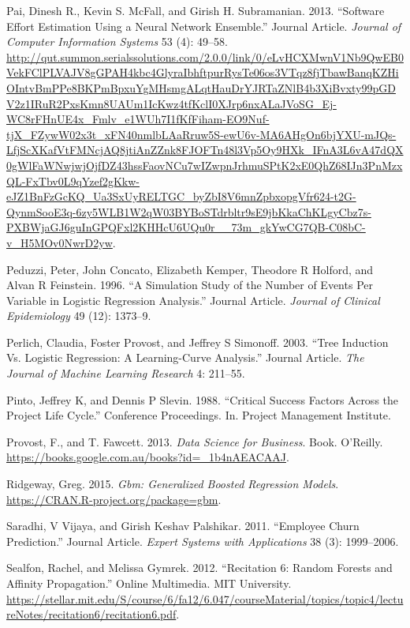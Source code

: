 \documentclass[]{elsarticle} %
\begin{document}
\hypertarget{ref-Pai2013}{}
Pai, Dinesh R., Kevin S. McFall, and Girish H. Subramanian. 2013.
``Software Effort Estimation Using a Neural Network Ensemble.'' Journal
Article. \emph{Journal of Computer Information Systems} 53 (4): 49--58.
\url{http://qut.summon.serialssolutions.com/2.0.0/link/0/eLvHCXMwnV1Nb9QwEB0VekFClPLVAJV8gGPAH4kbc4GlyraIbhftpurRysTe06os3VTqz8fjTbawBanqKZHiOIntvBmPPe8BKPmBpxuYgMHsmgALqtHauDrYJRTaZNlB4b3XiBvxty99pGDV2z1IRuR2PxsKmn8UAUm1IcKwz4tfKclI0XJrp6nxALaJVoSG_Ej-WC8rFHnUE4x_Fmlv_e1WUh7I1fKfFiham-EO9Nuf-tjX_FZywW02x3t_xFN40nmlbLAaRruw5S-ewU6v-MA6AHgOn6bjYXU-mJQs-LfjScXKafVtFMNcjAQ8jtiAnZZnk8FJOFTn48l3Vp5Oy9HXk_IFnA3L6vA47dQX0gWlFaWNwjwjOjfDZ43hssFaovNCu7wIZwpnJrhmuSPtK2xE0QhZ68IJn3PnMzxQL-FxTbv0L9qYzef2gKkw-eJZ1BnFzGcKQ_Ua3SxUyRELTGC_byZbI8V6mnZpbxopgVfr624-t2G-QynmSooE3q-6zy5WLB1W2qW03BYBoSTdrbltr9sE9jbKkaChKLgyCbz7s-PXBWjaGJ6guInGPQFxl2KHHcU6UQu0r__73m_gkYwCG7QB-C08bC-v_H5MOv0NwrD2yw}.

\hypertarget{ref-Peduzzi1996}{}
Peduzzi, Peter, John Concato, Elizabeth Kemper, Theodore R Holford, and
Alvan R Feinstein. 1996. ``A Simulation Study of the Number of Events
Per Variable in Logistic Regression Analysis.'' Journal Article.
\emph{Journal of Clinical Epidemiology} 49 (12): 1373--9.

\hypertarget{ref-Perlich2003}{}
Perlich, Claudia, Foster Provost, and Jeffrey S Simonoff. 2003. ``Tree
Induction Vs. Logistic Regression: A Learning-Curve Analysis.'' Journal
Article. \emph{The Journal of Machine Learning Research} 4: 211--55.

\hypertarget{ref-Pinto1988}{}
Pinto, Jeffrey K, and Dennis P Slevin. 1988. ``Critical Success Factors
Across the Project Life Cycle.'' Conference Proceedings. In. Project
Management Institute.

\hypertarget{ref-Provost2013}{}
Provost, F., and T. Fawcett. 2013. \emph{Data Science for Business}.
Book. O'Reilly. \url{https://books.google.com.au/books?id=_1b4nAEACAAJ}.

\hypertarget{ref-gbm}{}
Ridgeway, Greg. 2015. \emph{Gbm: Generalized Boosted Regression Models}.
\url{https://CRAN.R-project.org/package=gbm}.

\hypertarget{ref-Saradhi2011}{}
Saradhi, V Vijaya, and Girish Keshav Palshikar. 2011. ``Employee Churn
Prediction.'' Journal Article. \emph{Expert Systems with Applications}
38 (3): 1999--2006.

\hypertarget{ref-Sealfon2012}{}
Sealfon, Rachel, and Melissa Gymrek. 2012. ``Recitation 6: Random
Forests and Affinity Propagation.'' Online Multimedia. MIT University.
\url{https://stellar.mit.edu/S/course/6/fa12/6.047/courseMaterial/topics/topic4/lectureNotes/recitation6/recitation6.pdf}.
\end{document}

